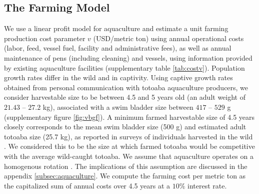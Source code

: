 \subsection{The Farming Model}
We use a linear profit model for aquaculture and estimate a unit farming production cost parameter $v$ (USD/metric ton) using annual operational costs (labor, feed, vessel fuel, facility and administrative fees), as well as annual maintenance of pens (including cleaning) and vessels, using information provided by existing aquaculture facilities (supplementary table \ref{tab:costv}). Population growth rates differ in the wild and in captivity. Using captive growth rates obtained from personal communication with totoaba aquaculture producers, we consider harvestable size to be between 4.5 and 5 years old (an adult weight of $21.43$ – $27.2$ kg), associated with a swim bladder size between $417$ – $529$ g (supplementary figure \ref{fig:vbgf}). A minimum farmed harvestable size of 4.5 years closely corresponds to the mean swim bladder size (500 g) and estimated adult totoaba size (25.7 kg), as reported in surveys of individuals harvested in the wild \citep{cisneros-mata_evaluacion_2020}. We considered this to be the size at which farmed totoaba would be competitive with the average wild-caught totoaba. We assume that aquaculture operates on a homogenous rotation \citep{faustmann1849, mitra_faustmann_1986}. The implications of this assumption are discussed in the appendix \ref{subsec:aquaculture}. We compute the farming cost per metric ton as the capitalized sum of annual costs over 4.5 years at a $10\%$ interest rate.
